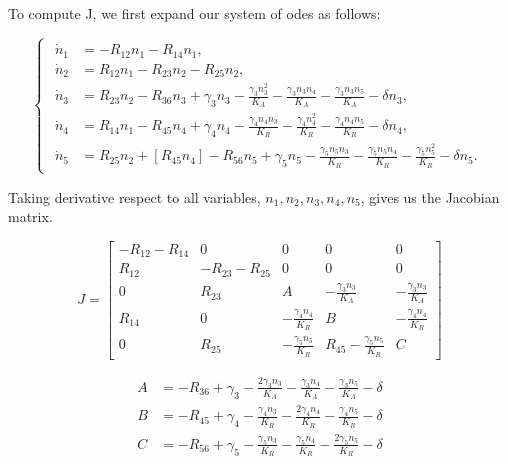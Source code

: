 To compute J, we first expand our system of odes as follows:

\begin{equation}
\begin{cases}
\begin{aligned}
    \dot{n}_1 &= -R_{12}n_1 - R_{14}n_1, \\
    \dot{n}_2 &= R_{12}n_1 - R_{23}n_2 - R_{25}n_2, \\
    \dot{n}_3 &= R_{23}n_2 - R_{36}n_3 + \gamma_3 n_3 
    - \frac{\gamma_3 n_3^2}{K_A} - \frac{\gamma_3 n_3 n_4}{K_A} - \frac{\gamma_3 n_3 n_5}{K_A} - \delta n_3, \\
    \dot{n}_4 &= R_{14}n_1 - R_{45}n_4 + \gamma_4 n_4 
    - \frac{\gamma_4 n_4 n_3}{K_R} - \frac{\gamma_4 n_4^2}{K_R} - \frac{\gamma_4 n_4 n_5}{K_R} - \delta n_4, \\

    \dot{n}_5 &= R_{25}n_2 + [R_{45}n_4] - R_{56}n_5 + \gamma_5 n_5  %
    
    - \frac{\gamma_5 n_5 n_3}{K_R} - \frac{\gamma_5 n_5 n_4}{K_R} - \frac{\gamma_5 n_5^2}{K_R} - \delta n_5.
\end{aligned}
\end{cases}
\end{equation}

Taking derivative respect to all variables, $n_1, n_2, n_3, n_4, n_5$, gives us the Jacobian matrix.

\begin{equation}
\renewcommand{\arraystretch}{1.5}
J = \begin{bmatrix}
- R_{12} - R_{14} & 0 & 0 & 0 & 0 \\
R_{12} & - R_{23} - R_{25} & 0 & 0 & 0 \\
0 & R_{23} & A & - \frac{\gamma_3 n_3}{K_A} & - \frac{\gamma_3 n_3}{K_A} \\
R_{14} & 0 & - \frac{\gamma_4 n_4}{K_R} &  B & - \frac{\gamma_4 n_4}{K_R} \\
0 & R_{25} & - \frac{\gamma_5 n_5}{K_R} &  R_{45} - \frac{\gamma_5 n_5}{K_R} & C
\end{bmatrix}
\end{equation}

\begin{align*}
A &= -R_{36} + \gamma_3 - \frac{2 \gamma_3 n_3}{K_A} - \frac{\gamma_3 n_4}{K_A} - \frac{\gamma_3 n_5}{K_A} - \delta \\
B &= -R_{45} + \gamma_4 - \frac{\gamma_4 n_3}{K_R} - \frac{2 \gamma_4 n_4}{K_R} - \frac{\gamma_4 n_5}{K_R} - \delta \\
C &= -R_{56} + \gamma_5 - \frac{\gamma_5 n_3}{K_R} - \frac{\gamma_5 n_4}{K_R} - \frac{2 \gamma_5 n_5}{K_R} - \delta
\end{align*}


